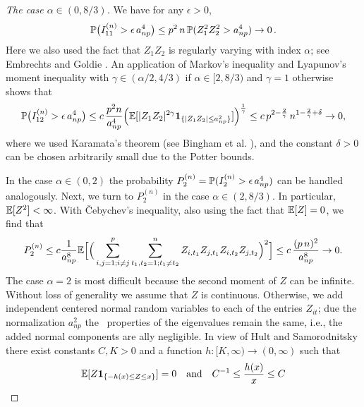 \begin{proof}[The case $\alpha \in (0,8/3)$]
We have for any $\epsilon>0$,
\begin{equation*}
\P \big( I_{11}^{(n)}>\epsilon\,a_{np}^4\big)\le   p^2\,n\, \P(Z_{1}^2 Z_{2}^2 > a_{np}^4) \to 0\,.
\end{equation*}
Here we also used the fact that $Z_1Z_2$ is regularly varying with index $\alpha$; see Embrechts and Goldie \cite{embrechts:goldie:1980}. 
An application of Markov's inequality and Lyapunov's moment inequality with $\gamma\in (\alpha/2, 4/3)$ if $\alpha \in [2,8/3)$ and $\gamma=1$ otherwise shows that 
\begin{equation*}
\P\big( I_{12}^{(n)}>\epsilon\,a_{np}^4\big)\le
c\, \frac{p^2n}{a_{np}^4} \Big(\E[|Z_{1} Z_{2}|^{2\gamma}\1_{\{ |Z_{1} Z_{2}| \le a_{np}^2 \}}]\Big)^{\frac{1}{\gamma}}\le 
c\, p^{2-\frac{2}{\gamma}}\,n^{1-\frac{2}{\gamma}+\delta}\to 0,
\end{equation*} 
where we used Karamata's theorem (see Bingham et al. \cite{bingham:goldie:teugels:1987}), and the constant $\delta>0$ can be chosen arbitrarily small due to the Potter bounds.
\par
In the case $\alpha \in (0,2)$ the probability $P_{2}^{(n)}=\P(I_2^{(n)}>\epsilon\,a_{np}^4)$ can be handled analogously. Next, we turn to $P_{2}^{(n)}$ in the case $\alpha \in (2,8/3)$. In particular, $\E [Z^2]<\infty$. With \v Cebychev's inequality, also using the fact that $\E [Z]=0$,  we find that
\begin{equation}\label{eq:sdvfg}
P_{2}^{(n)} \le c \frac{1}{a_{np}^8} \E\Big[ \Big( \sum_{i, j =1; i\neq j}^p   \sum_{t_1,t_2=1; t_1\neq t_2}^n Z_{i,t_1} Z_{j,t_1}Z_{i,t_2} Z_{j,t_2}\Big)^2 \Big]\le c\,\frac{(p\,n)^2}{a_{np}^8} \to 0.
\end{equation}
The case $\alpha=2$ is
most difficult because the second moment of $Z$ can be infinite. 
Without loss of generality we assume that $Z$ is continuous. Otherwise, we add independent centered normal random variables 
to each of the entries $Z_{it}$; due the normalization $a_{np}^2$ 
the \asy\ properties of the eigenvalues remain the same, i.e., the added normal components are \asy ally negligible.  
In view of Hult and Samorodnitsky \cite[Lemma~$4.2$]{hult:2008} there exist constants $C,K>0$ and  a 
function $h:[K,\infty) \to (0,\infty)$ such that 
\begin{equation}\label{eq:fcth}
\E[Z \1_{\{ -h(x) \le Z \le x \}}]=0 \quad \mbox{and} \quad C^{-1} \le \frac{h(x)}{x} \le C
\end{equation}

\end{proof}

